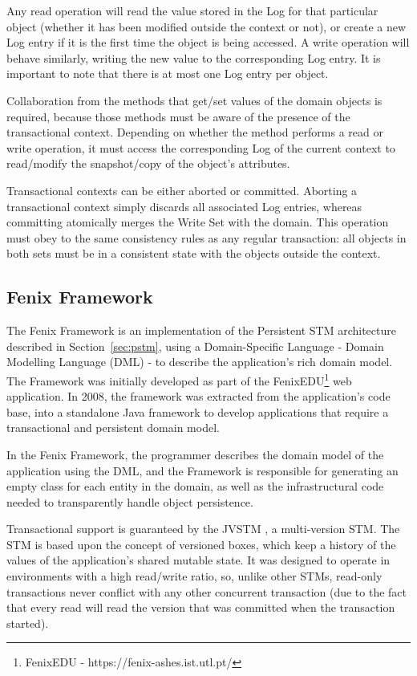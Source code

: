 \documentclass{llncs}
\begin{document}
Any read operation will read the value stored in the Log for that
particular object (whether it has been modified outside the context or
not), or create a new Log entry if it is the first time the object is
being accessed. A write operation will behave similarly, writing the
new value to the corresponding Log entry. It is important to note that
there is at most one Log entry per object.

Collaboration from the methods that get/set values of the domain
objects is required, because those methods must be aware of the
presence of the transactional context. Depending on whether the method
performs a read or write operation, it must access the corresponding
Log of the current context to read/modify the snapshot/copy of the
object's attributes.

Transactional contexts can be either aborted or committed. Aborting a
transactional context simply discards all associated Log entries,
whereas committing atomically merges the Write Set with the
domain. This operation must obey to the same consistency rules as any
regular transaction: all objects in both sets must be in a consistent
state with the objects outside the context.

\subsection{Fenix Framework}

The Fenix Framework \cite{fernandes2011strict} is an implementation of
the Persistent STM architecture described in Section~\ref{sec:pstm},
using a Domain-Specific Language - Domain Modelling Language (DML)
\cite{cachopo2007development} - to describe the application's rich
domain model. The Framework was initially developed as part of the
FenixEDU\footnote{FenixEDU - https://fenix-ashes.ist.utl.pt/} web
application. In 2008, the framework was extracted from the
application's code base, into a standalone Java framework to develop
applications that require a transactional and persistent domain model.

In the Fenix Framework, the programmer describes the domain model of
the application using the DML, and the Framework is responsible for
generating an empty class for each entity in the domain, as well as
the infrastructural code needed to transparently handle object
persistence.

Transactional support is guaranteed by the JVSTM
\cite{cachopo2006versioned}, a multi-version STM. The STM is based
upon the concept of versioned boxes, which keep a history of the
values of the application's shared mutable state. It was designed to
operate in environments with a high read/write ratio, so, unlike other
STMs, read-only transactions never conflict with any other concurrent
transaction (due to the fact that every read will read the version
that was committed when the transaction started).
\end{document}

